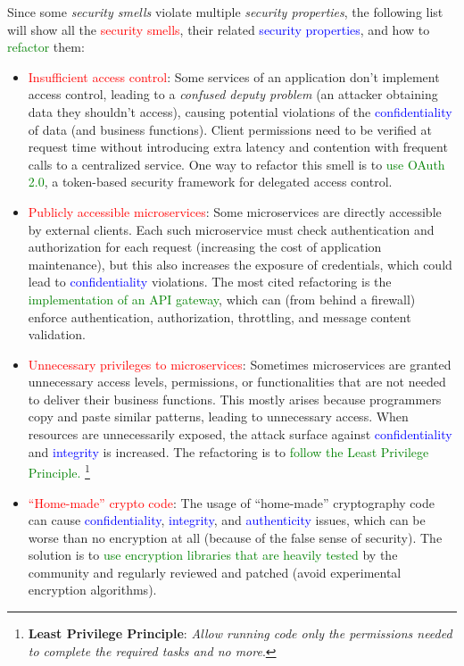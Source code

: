 \noindent Since some \textit{security smells} violate multiple \textit{security properties}, the following list will show all the \textcolor{red}{security smells}, their related \textcolor{blue}{security properties}, and how to \textcolor{green}{refactor} them:

\begin{itemize}
    \item \textcolor{red}{Insufficient access control}: Some services of an application don't implement access control, leading to a \textit{confused deputy problem} (an attacker obtaining data they shouldn’t access), causing potential violations of the \textcolor{blue}{confidentiality} of data (and business functions). Client permissions need to be verified at request time without introducing extra latency and contention with frequent calls to a centralized service. One way to refactor this smell is to \textcolor{green}{use OAuth 2.0}, a token-based security framework for delegated access control.
    \item \textcolor{red}{Publicly accessible microservices}: Some microservices are directly accessible by external clients. Each such microservice must check authentication and authorization for each request (increasing the cost of application maintenance), but this also increases the exposure of credentials, which could lead to \textcolor{blue}{confidentiality} violations. The most cited refactoring is the \textcolor{green}{implementation of an API gateway}, which can (from behind a firewall) enforce authentication, authorization, throttling, and message content validation.
    \item \textcolor{red}{Unnecessary privileges to microservices}: Sometimes microservices are granted unnecessary access levels, permissions, or functionalities that are not needed to deliver their business functions. This mostly arises because programmers copy and paste similar patterns, leading to unnecessary access. When resources are unnecessarily exposed, the attack surface against \textcolor{blue}{confidentiality} and \textcolor{blue}{integrity} is increased. The refactoring is to \textcolor{green}{follow the Least Privilege Principle.} \footnote{\textbf{Least Privilege Principle}: \textit{Allow running code only the permissions needed to complete the required tasks and no more}.}
    \item \textcolor{red}{``Home-made'' crypto code}: The usage of ``home-made'' cryptography code can cause \textcolor{blue}{confidentiality}, \textcolor{blue}{integrity}, and \textcolor{blue}{authenticity} issues, which can be worse than no encryption at all (because of the false sense of security). The solution is to \textcolor{green}{use encryption libraries that are heavily tested} by the community and regularly reviewed and patched (avoid experimental encryption algorithms).

\end{itemize}

